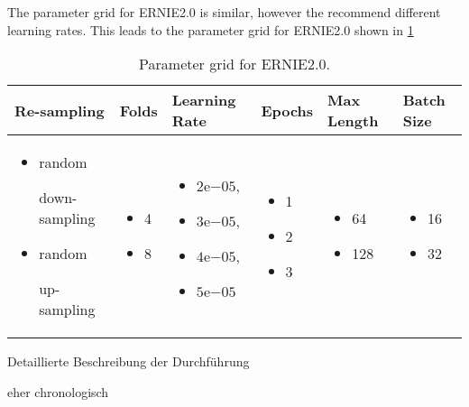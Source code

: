 The parameter grid for \ac{ERNIE2.0} is similar, however the \textcite{Sun:2019a} recommend different learning rates.
This leads to the parameter grid for \ac{ERNIE2.0} shown in \cref{tab:study:execution:paramter_grid:ERNIE2.0}
\begin{table}[htpb]
    \centering
    \begin{tabular}{ p{3.5cm} p{1.5cm} p{2cm} p{1.5cm} p{1.6cm} p{1.5cm} }
        \toprule
         Re-sampling & Folds & Learning Rate & Epochs & Max Length & Batch Size \\
        \midrule
            \begin{itemize}[noitemsep,topsep=0pt,leftmargin=15pt]
                \item {random

                down-sampling}
                \item {random

                up-sampling}
            \end{itemize}
            &\begin{itemize}[noitemsep,topsep=0pt,leftmargin=15pt]
                \item 4
                \item 8
            \end{itemize}
            & \begin{itemize}[noitemsep,topsep=0pt,leftmargin=15pt]
                \item $2\mathrm{e}{-05}$,
                \item $3\mathrm{e}{-05}$,
                \item $4\mathrm{e}{-05}$,
                \item $5\mathrm{e}{-05}$
            \end{itemize}
            & \begin{itemize}[noitemsep,topsep=0pt,leftmargin=15pt]
                \item 1
                \item 2
                \item 3
            \end{itemize}
            & \begin{itemize}[noitemsep,topsep=0pt,leftmargin=15pt]
                \item 64
                \item 128
            \end{itemize}
            & \begin{itemize}[noitemsep,topsep=0pt,leftmargin=15pt]
                \item 16
                \item 32
            \end{itemize}\\
        \bottomrule
    \end{tabular}
    \caption[Parameter Grid for \ac{ERNIE2.0}]{Parameter grid for \ac{ERNIE2.0}.}\label{tab:study:execution:paramter_grid:ERNIE2.0}
\end{table}

Detaillierte Beschreibung der Durchführung

eher chronologisch
